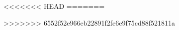 \documentclass[landt]{skythesis}
\begin{document}

\frontmatter
%
{
 \label{thesiscontent} 
\singlespacing\tableofcontents           %
}

\mainmatter
\makeatletter




\makeatother
\backmatter




<<<<<<< HEAD
%
=======

>>>>>>> 6552f52e966eb22891f2fe6e9f75cd88f521811a
\end{document}
